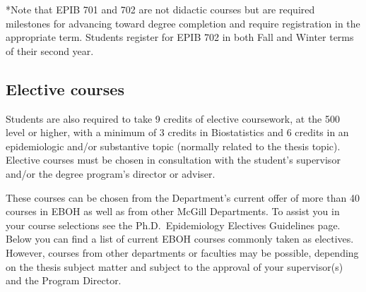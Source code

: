 \documentclass[
]{book}
\begin{document}
*Note that EPIB 701 and 702 are not didactic courses but are required milestones for advancing toward degree completion and require registration in the appropriate term. Students register for EPIB 702 in both Fall and Winter terms of their second year.

\hypertarget{elective-courses-1}{%
\subsection{Elective courses}\label{elective-courses-1}}

Students are also required to take 9 credits of elective coursework, at the 500 level or higher, with a minimum of 3 credits in Biostatistics and 6 credits in an epidemiologic and/or substantive topic (normally related to the thesis topic). Elective courses must be chosen in consultation with the student's supervisor and/or the degree program's director or adviser.

These courses can be chosen from the Department's current offer of more than 40 courses in EBOH as well as from other McGill Departments. To assist you in your course selections see the Ph.D.~Epidemiology Electives Guidelines page. Below you can find a list of current EBOH courses commonly taken as electives. However, courses from other departments or faculties may be possible, depending on the thesis subject matter and subject to the approval of your supervisor(s) and the Program Director.
\end{document}
